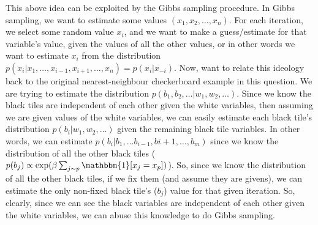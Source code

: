 This above idea can be exploited by the Gibbs sampling procedure. In Gibbs sampling, we want to estimate some values $(x_1, x_2, \dots, x_n)$. For each iteration, we select some random value $x_i$, and we want to make a guess/estimate for that variable's value, given the values of all the other values, or in other words we want to estimate $x_i$ from the distribution $p(x_i \vert x_1, \dots, x_{i-1}, x_{i+1}, \dots, x_n) = p(x_i \vert x_{-i})$. Now, want to relate this ideology back to the original nearest-neighbour checkerboard example in this question. We are trying to estimate the distribution $p(b_1, b_2, \dots \vert w_1, w_2, \dots)$. Since we know the black tiles are independent of each other given the white variables, then assuming we are given values of the white variables, we can easily estimate each black tile's distribution $p(b_i \vert w_1, w_2, \dots)$ given the remaining black tile variables. In other words, we can estimate $p(b_i \vert b_1, \dots b_{i-1}, b{i+1}, \dots, b_m)$ since we know the distribution of all the other black tiles ($p(b_j) \propto \exp(\beta \sum_{j \sim p} \mathbbm{1}[x_j = x_p])$). So, since we know the distribution of all the other black tiles, if we fix them (and assume they are givens), we can estimate the only non-fixed black tile's ($b_j$) value for that given iteration. So, clearly, since we can see the black variables are independent of each other given the white variables, we can abuse this knowledge to do Gibbs sampling.